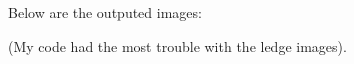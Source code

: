 \documentclass[fleqn]{article}
\begin{document}
Below are the outputed images:
\begin{center}
    (My code had the most trouble with the ledge images).
\end{center}
\end{document}
